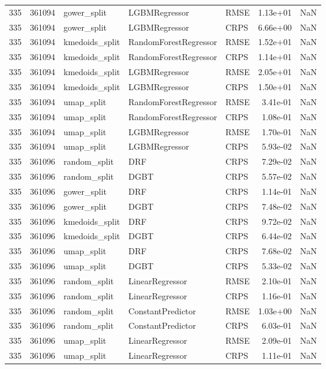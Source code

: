 \begin{tabular}{rrlllrr}
335 & 361094 & gower\_split & LGBMRegressor & RMSE & 1.13e+01 & NaN \\
335 & 361094 & gower\_split & LGBMRegressor & CRPS & 6.66e+00 & NaN \\
335 & 361094 & kmedoids\_split & RandomForestRegressor & RMSE & 1.52e+01 & NaN \\
335 & 361094 & kmedoids\_split & RandomForestRegressor & CRPS & 1.14e+01 & NaN \\
335 & 361094 & kmedoids\_split & LGBMRegressor & RMSE & 2.05e+01 & NaN \\
335 & 361094 & kmedoids\_split & LGBMRegressor & CRPS & 1.50e+01 & NaN \\
335 & 361094 & umap\_split & RandomForestRegressor & RMSE & 3.41e-01 & NaN \\
335 & 361094 & umap\_split & RandomForestRegressor & CRPS & 1.08e-01 & NaN \\
335 & 361094 & umap\_split & LGBMRegressor & RMSE & 1.70e-01 & NaN \\
335 & 361094 & umap\_split & LGBMRegressor & CRPS & 5.93e-02 & NaN \\
335 & 361096 & random\_split & DRF & CRPS & 7.29e-02 & NaN \\
335 & 361096 & random\_split & DGBT & CRPS & 5.57e-02 & NaN \\
335 & 361096 & gower\_split & DRF & CRPS & 1.14e-01 & NaN \\
335 & 361096 & gower\_split & DGBT & CRPS & 7.48e-02 & NaN \\
335 & 361096 & kmedoids\_split & DRF & CRPS & 9.72e-02 & NaN \\
335 & 361096 & kmedoids\_split & DGBT & CRPS & 6.44e-02 & NaN \\
335 & 361096 & umap\_split & DRF & CRPS & 7.68e-02 & NaN \\
335 & 361096 & umap\_split & DGBT & CRPS & 5.33e-02 & NaN \\
335 & 361096 & random\_split & LinearRegressor & RMSE & 2.10e-01 & NaN \\
335 & 361096 & random\_split & LinearRegressor & CRPS & 1.16e-01 & NaN \\
335 & 361096 & random\_split & ConstantPredictor & RMSE & 1.03e+00 & NaN \\
335 & 361096 & random\_split & ConstantPredictor & CRPS & 6.03e-01 & NaN \\
335 & 361096 & umap\_split & LinearRegressor & RMSE & 2.09e-01 & NaN \\
335 & 361096 & umap\_split & LinearRegressor & CRPS & 1.11e-01 & NaN \\

\end{tabular}
